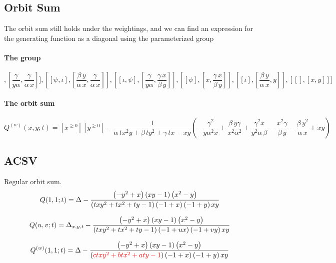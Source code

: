 \documentclass[11pt]{article}
\renewcommand{\geq}{\geqslant}
\begin{document}
\subsection{Orbit Sum}
The orbit sum still holds under the weightings, and we can find an
expression for the generating function as a diagonal using the
parameterized group


\paragraph{The group}
\begin{equation}
[[[\iota,\psi,\iota],[{\frac {\gamma}{y\alpha}},{\frac {\gamma}{\alpha
\,x}}]],[[\psi,\iota],[{\frac {\beta\,y}{\alpha\,x}},{\frac {\gamma}{
\alpha\,x}}]],[[\iota,\psi],[{\frac {\gamma}{y\alpha}},{\frac {\gamma
\,x}{\beta\,y}}]],[[\psi],[x,{\frac {\gamma\,x}{\beta\,y}}]],[[\iota],
[{\frac {\beta\,y}{\alpha\,x}},y]],[[],[x,y]]]
\end{equation}

\paragraph{The orbit sum}
\begin{equation}
\label{eq:WtOrbitSum}
Q^{(w)}(x,y;t)=[x^{\geq 0}][y^{\geq 0}]-{\frac {1}{\alpha\,t{x}^{2}y+\beta\,t{y}^{2}+\gamma\,tx-xy} \left( -{
\frac {{\gamma}^{2}}{y{\alpha}^{2}x}}+{\frac {\beta\,y\gamma}{{x}^{2}{
\alpha}^{2}}}+{\frac {{\gamma}^{2}x}{{y}^{2}\alpha\,\beta}}-{\frac {{x
}^{2}\gamma}{\beta\,y}}-{\frac {\beta\,{y}^{2}}{\alpha\,x}}+xy
 \right) }
\end{equation}
\subsection{ACSV}

Regular orbit sum.
\[Q(1,1;t)= \Delta -{\frac { \left( -{y}^{2}+x \right)  \left( xy-1 \right)  \left( {x}^{2}-y \right) }{ \left( tx{y}^{2}+t{x}^{2}+ty-1 \right)  \left( -1+x \right)  \left( -1+y \right) \\
\mbox{}xy}}\]

\[Q(u,v;t)= \Delta_{x,y,t} -{\frac { \left( -{y}^{2}+x \right)  \left( xy-1 \right)  \left( {x}^{2}-y \right) }{ \left( tx{y}^{2}+t{x}^{2}+ty-1 \right)  \left( -1+ux \right)  \left( -1+vy \right) \\
\mbox{}xy}}\]


\[Q^{(w)}(1,1;t)= \Delta -{\frac { \left( -{y}^{2}+x \right)  \left( xy-1 \right)  \left( {x}^{2}-y \right) }{ \left({\color{red} ctx{y}^{2}+bt{x}^{2}+aty-1 }\right)  \left( -1+x \right)  \left( -1+y \right) \\
\mbox{}xy}}\]
\end{document}
